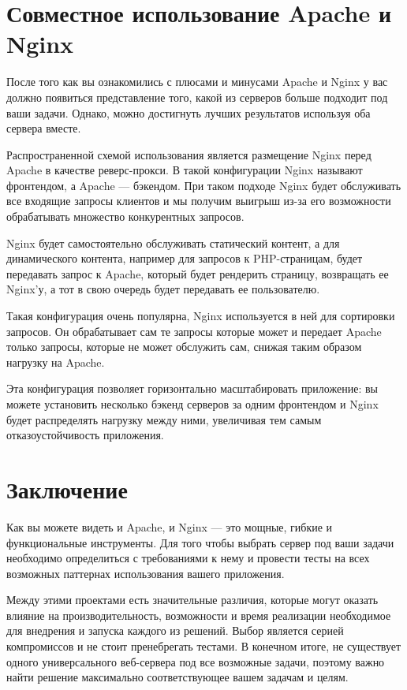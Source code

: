 \documentclass[14pt, a4paper]{article}
\begin{document}
\section*{Совместное использование Apache и Nginx}

После того как вы ознакомились с плюсами и минусами Apache и Nginx у вас должно появиться 
представление того, какой из серверов больше подходит под ваши задачи. Однако, можно достигнуть 
лучших результатов используя оба сервера вместе.


Распространенной схемой использования является размещение Nginx перед Apache в качестве 
реверс-прокси. В такой конфигурации Nginx называют фронтендом, а Apache — бэкендом. 
При таком подходе Nginx будет обслуживать все входящие запросы клиентов и мы получим 
выигрыш из-за его возможности обрабатывать множество конкурентных запросов.


Nginx будет самостоятельно обслуживать статический контент, а для динамического контента, 
например для запросов к PHP-страницам, будет передавать запрос к Apache, который будет 
рендерить страницу, возвращать ее Nginx'у, а тот в свою очередь будет передавать ее пользователю.


Такая конфигурация очень популярна, Nginx используется в ней для сортировки запросов. Он 
обрабатывает сам те запросы которые может и передает Apache только запросы, которые не может 
обслужить сам, снижая таким образом нагрузку на Apache.


Эта конфигурация позволяет горизонтально масштабировать приложение: вы можете установить 
несколько бэкенд серверов за одним фронтендом и Nginx будет распределять нагрузку между ними, 
увеличивая тем самым отказоустойчивость приложения.\\



\section*{Заключение}

Как вы можете видеть и Apache, и Nginx — это мощные, гибкие и функциональные инструменты. 
Для того чтобы выбрать сервер под ваши задачи необходимо определиться с требованиями к нему 
и провести тесты на всех возможных паттернах использования вашего приложения.


Между этими проектами есть значительные различия, которые могут оказать влияние на производительность, 
возможности и время реализации необходимое для внедрения и запуска каждого из решений. Выбор является 
серией компромиссов и не стоит пренебрегать тестами. В конечном итоге, не существует одного 
универсального веб-сервера под все возможные задачи, поэтому важно найти решение максимально 
соответствующее вашем задачам и целям.
\end{document}
